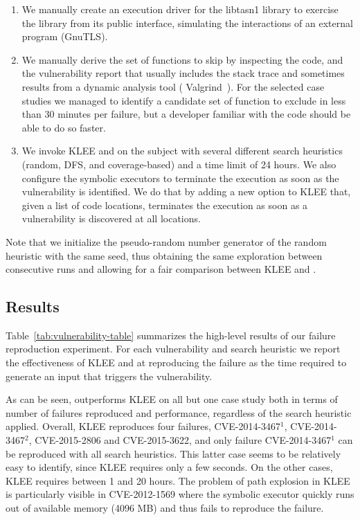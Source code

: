 \begin{enumerate}[leftmargin=*]
\item We manually create an execution driver for the \textsf{libtasn1}
  library to exercise the library from its public interface,
  simulating the interactions of an external program (\eg GnuTLS).
\item We manually derive the set of functions to skip by inspecting
  the code, and the vulnerability report that usually includes the
  stack trace and sometimes results from a dynamic analysis tool (\eg
  Valgrind~\cite{valgrind2003}). For the selected case studies we
  managed to identify a candidate set of function to exclude in less
  than 30 minutes per failure, but a developer familiar with the code
  should be able to do so faster.
\item We invoke KLEE and \toolname on the subject with several
  different search heuristics (random, DFS, and coverage-based) and a
  time limit of 24 hours. We also configure the symbolic executors to
  terminate the execution as soon as the vulnerability is
  identified. We do that by adding a new option to KLEE that, given a
  list of code locations, terminates the execution as soon as a
  vulnerability is discovered at all locations.
\end{enumerate}

Note that we initialize the pseudo-random number generator of the
random heuristic with the same seed, thus obtaining the same
exploration between consecutive runs and allowing for a fair
comparison between KLEE and \toolname.

\subsection{Results}
Table~\ref{tab:vulnerability-table} summarizes the high-level results
of our failure reproduction experiment. For each vulnerability and
search heuristic we report the effectiveness of KLEE and \toolname at
reproducing the failure as the time required to generate an input that
triggers the vulnerability.

As can be seen, \toolname outperforms KLEE on all but one case study
both in terms of number of failures reproduced and performance,
regardless of the search heuristic applied. Overall, KLEE reproduces
four failures, CVE-2014-3467$^1$, CVE-2014-3467$^2$, CVE-2015-2806 and
CVE-2015-3622, and only failure CVE-2014-3467$^1$ can be reproduced
with all search heuristics. This latter case seems to be relatively
easy to identify, since KLEE requires only a few seconds. On the other
cases, KLEE requires between 1 and 20 hours. The problem of path
explosion in KLEE is particularly visible in CVE-2012-1569 where the
symbolic executor quickly runs out of available memory (4096 MB) and
thus fails to reproduce the failure.

